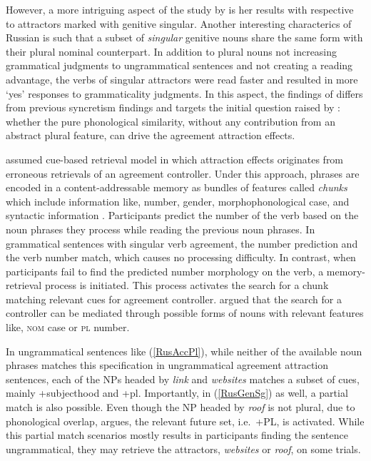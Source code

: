 \documentclass[
  authoryear,
  3p]{elsarticle}
\begin{document}
However, a more intriguing aspect of the study by \citet{Slioussar2018}
is her results with respective to attractors marked with genitive
singular. Another interesting characterics of Russian is such that a
subset of \emph{singular} genitive nouns share the same form with their
plural nominal counterpart. In addition to plural nouns not increasing
grammatical judgments to ungrammatical sentences and not creating a
reading advantage, the verbs of singular attractors were read faster and
resulted in more `yes' responses to grammaticality judgments. In this
aspect, the findings of \citet{Slioussar2018} differs from previous
syncretism findings and targets the initial question raised by
\citet{BockEberhard1993}: whether the pure phonological similarity,
without any contribution from an abstract plural feature, can drive the
agreement attraction effects.

\citet{Slioussar2018} assumed cue-based retrieval model in which
attraction effects originates from erroneous retrievals of an agreement
controller. Under this approach, phrases are encoded in a
content-addressable memory as bundles of features called \emph{chunks}
which include information like, number, gender, morphophonological case,
and syntactic information \citep{SmithVasishth2020, LV05}. Participants
predict the number of the verb based on the noun phrases they process
while reading the previous noun phrases. In grammatical sentences with
singular verb agreement, the number prediction and the verb number
match, which causes no processing difficulty. In contrast, when
participants fail to find the predicted number morphology on the verb, a
memory-retrieval process is initiated. This process activates the search
for a chunk matching relevant cues for agreement controller.
\citet{Slioussar2018} argued that the search for a controller can be
mediated through possible forms of nouns with relevant features like,
\textsc{nom} case or \textsc{pl} number.

In ungrammatical sentences like (\ref{RusAccPl}), while neither of the
available noun phrases matches this specification in ungrammatical
agreement attraction sentences, each of the NPs headed by \emph{link}
and \emph{websites} matches a subset of cues, mainly +subjecthood and
+pl. Importantly, in (\ref{RusGenSg}) as well, a partial match is also
possible. Even though the NP headed by \emph{roof} is not plural, due to
phonological overlap, \citet{Slioussar2018} argues, the relevant future
set, i.e.~+PL, is activated. While this partial match scenarios mostly
results in participants finding the sentence ungrammatical, they may
retrieve the attractors, \emph{websites} or \emph{roof}, on some trials.
\end{document}
